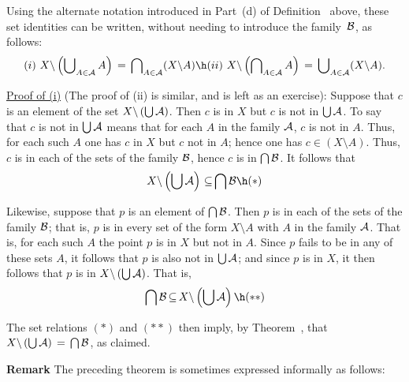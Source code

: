 {\noindent Using the alternate notation introduced in Part~(d) of Definition~ above,
    these set identities can be written, without needing to introduce the family~${\cal B}$, as follows:
        \begin{displaymath}
        (i)\,\, X{\setminus}\left({\bigcup}_{A{\in}{\cal A}}\, A\right) \,=\, {\bigcap}_{A{\in}{\cal A}} (X{\setminus}A) \h
        (ii)\,\, X{\setminus}\left({\bigcap}_{A{\in}{\cal A}}\, A\right) \,=\, {\bigcup}_{A{\in}{\cal A}} (X{\setminus}A).
        \end{displaymath}
\V
\V

        \underline{Proof of (i)} (The proof of (ii) is similar, and is left as an exercise): Suppose that $c$ is an element of the set $X{\setminus}\left({\bigcup}\, {\cal A}\right)$.
	Then $c$ is in $X$ but $c$ is not in ${\bigcup}\,{\cal A}$.
    To say that $c$ is not in ${\bigcup}\,{\cal A}$ means that for each $A$ in the family ${\cal A}$, $c$ is not in $A$.
	Thus, for each such $A$ one has $c$ in $X$ but $c$ not in $A$;
    hence one has $c{\in}(X{\setminus}A)$.
    Thus, $c$ is in each of the sets of the family ${\cal B}$, hence $c$ is in ${\bigcap}\,{\cal B}$.
	It follows that
        \begin{displaymath}
        X{\setminus}\left({\bigcup}\, {\cal A}\right) \,{\subseteq}\, {\bigcap}\,{\cal B} \h ({\ast})
        \end{displaymath}

		Likewise, suppose that $p$ is an element of ${\bigcap}\,{\cal B}$.
    Then $p$ is in each of the sets of the family ${\cal B}$;
    that is, $p$ is in every set of the form $X{\setminus}A$ with $A$ in the family ${\cal A}$.
    That is, for each such $A$ the point $p$ is in $X$ but not in $A$.
    Since $p$ fails to be in any of these sets $A$, it follows that $p$ is also not in ${\bigcup}\,{\cal A}$;
    and since $p$ is in $X$, it then follows that $p$ is in $X{\setminus}\left({\bigcup}\,{\cal A}\right)$.
    That is,
        \begin{displaymath}
        {\bigcap}\,{\cal B} \,{\subseteq}\, X{\setminus}\left({\bigcup}\, {\cal A}\right) \h ({\ast}{\ast})
        \end{displaymath}


        The set relations $({\ast})$ and $({\ast}{\ast})$ then imply, by Theorem~,
    that $ X{\setminus}\left({\bigcup}\, {\cal A}\right) \,=\, {\bigcap}\,{\cal B}$, as claimed.
    

\V

        {\bf Remark} The preceding theorem is sometimes expressed informally as follows:

}
